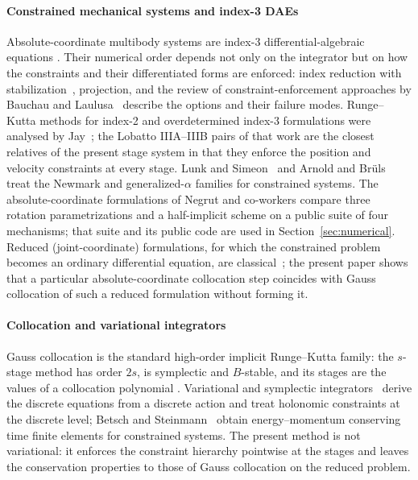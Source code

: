 \paragraph{Constrained mechanical systems and index-3 DAEs}
Absolute-coordinate multibody systems are index-3 differential-algebraic equations
\cite{hairer1993solving,ascher1998computer,petzold1986numerical}. Their numerical order depends
not only on the integrator but on how the constraints and their differentiated forms are enforced:
index reduction with stabilization~\cite{gear1985automatic}, projection, and the review of
constraint-enforcement approaches by Bauchau and Laulusa~\cite{bauchau2008review} describe the
options and their failure modes. Runge--Kutta methods for index-2 and overdetermined index-3
formulations were analysed by Jay~\cite{jay1996symplectic,jay2006specialized,jay2007specialized};
the Lobatto IIIA--IIIB pairs of that work are the closest relatives of the present stage system in
that they enforce the position and velocity constraints at every stage. Lunk and
Simeon~\cite{lunk2006solving} and Arnold and Br\"uls~\cite{arnold2007convergence} treat the
Newmark and generalized-$\alpha$ families for constrained systems. The absolute-coordinate
formulations of Negrut and co-workers
\cite{taves2020exponential,kissel2021dwelling,kissel2022absolute,fang2023halfimplicit,kissel2024velocitypartitioning}
compare three rotation parametrizations and a half-implicit scheme on a public suite of four
mechanisms; that suite and its public code are used in Section~\ref{sec:numerical}. Reduced
(joint-coordinate) formulations, for which the constrained problem becomes an ordinary
differential equation, are classical~\cite{nikravesh1988computer,shabana2020dynamics,jain2011robot};
the present paper shows that a particular absolute-coordinate collocation step coincides with
Gauss collocation of such a reduced formulation without forming it.

\paragraph{Collocation and variational integrators}
Gauss collocation is the standard high-order implicit Runge--Kutta family: the $s$-stage method has
order $2s$, is symplectic and $B$-stable, and its stages are the values of a collocation polynomial
\cite{hairer1993nonstiff,butcher2016numerical,hairer2006geometric}. Variational and symplectic
integrators~\cite{marsden2001discrete,leyendecker2008variational,leok2012prolongation,bourabee2009hamilton}
derive the discrete equations from a discrete action and treat holonomic constraints at the
discrete level; Betsch and Steinmann~\cite{betsch2002conservation} obtain energy--momentum
conserving time finite elements for constrained systems. The present method is not variational: it
enforces the constraint hierarchy pointwise at the stages and leaves the conservation properties
to those of Gauss collocation on the reduced problem.

